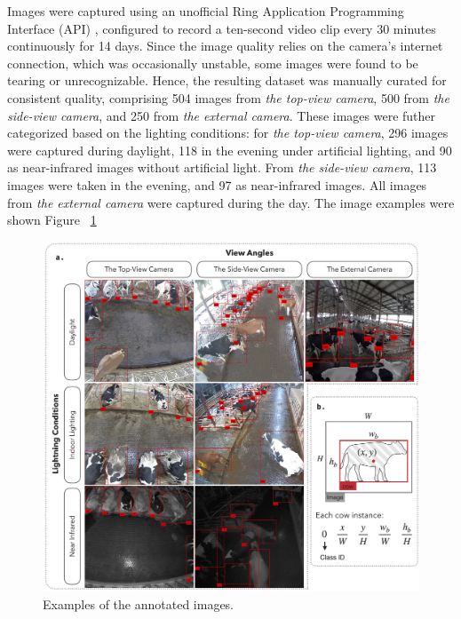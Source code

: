 Images were captured using an unofficial Ring Application Programming Interface (API) \citep{greif_dgreifring_2024}, configured to record a ten-second video clip every 30 minutes continuously for 14 days. Since the image quality relies on the camera's internet connection, which was occasionally unstable, some images were found to be tearing or unrecognizable. Hence, the resulting dataset was manually curated for consistent quality, comprising 504 images from \textit{the top-view camera}, 500 from \textit{the side-view camera}, and 250 from \textit{the external camera}. These images were futher categorized based on the lighting conditions: for \textit{the top-view camera}, 296 images were captured during daylight, 118 in the evening under artificial lighting, and 90 as near-infrared images without artificial light. From \textit{the side-view camera}, 113 images were taken in the evening, and 97 as near-infrared images. All images from \textit{the external camera} were captured during the day. The image examples were shown Figure ~\ref{fig:dataset}

\begin{figure}[h]
    \centering
    \includegraphics[width=1\textwidth]{figure_1.jpg}
    \caption{Examples of the annotated images.}
    \label{fig:dataset}
\end{figure}

